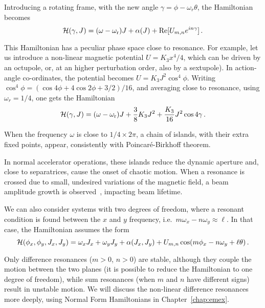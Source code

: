 Introducing a rotating frame, with the new angle $\gamma = \phi - \omega_r\theta$, the Hamiltonian becomes
%
\begin{equation}
	\mathcal{H}(\gamma, J) = (\omega-\omega_\text{r}) J + \alpha(J) + \Re[U_{m,n}e^{in\gamma}]\, .
\end{equation}

This Hamiltonian has a peculiar phase space close to resonance. For example, let us introduce a non-linear magnetic potential $U=K_3 x^4/4$, which can be driven by an octupole, or, at an higher perturbation order, also by a sextupole). In action-angle co-ordinates, the potential becomes $U= K_3 J^2 \cos^4 \phi$. Writing $\cos^4\phi = (\cos 4\phi + 4\cos 2\phi + 3/2)/16$, and averaging close to resonance, using $\omega_{r}=1/4$, one gets the Hamiltonian
%
\begin{equation}
\ham(\gamma, J) = (\omega-\omega_\text{r}) J + \frac{3}{8}K_3J^2 + \frac{K_3}{16} J^2 \cos 4\gamma\, . %
\end{equation}

When the frequency $\omega$ is close to $1/4 \times 2\pi$, a chain of islands, with their extra fixed points, appear, consistently with Poincaré-Birkhoff theorem.


In normal accelerator operations, these islands reduce the dynamic aperture and, close to separatrices, cause the onset of chaotic motion. When a resonance is crossed due to small, undesired variations of the magnetic field, a beam amplitude growth is observed~\cite{Guignard:185921}, impacting beam lifetime.

We can also consider systems with two degrees of freedom, where a resonant condition is found between the $x$ and $y$ frequency, i.e.\ $m\omega_x-n\omega_y\approx \ell$. In that case, the Hamiltonian assumes the form
%
\begin{equation}
	\mathcal{H}(\phi_x,\phi_y,J_x,J_y) = \omega_x J_x + \omega_y J_y + \alpha(J_x,J_y) + U_{m,n}\cos(m\phi_x- n\omega_y + \ell \theta)\, .
\end{equation}

Only difference resonances ($m>0$, $n>0$) are stable, although they couple the motion between the two planes (it is possible to reduce the Hamiltonian to one degree of freedom), while sum resonances (when $m$ and $n$ have different signs) result in unstable motion. We will discuss the non-linear difference resonances more deeply, using Normal Form Hamiltonians in Chapter~\ref{chap:emex}.

